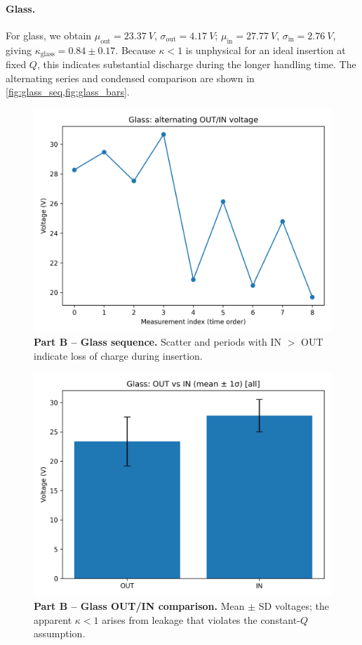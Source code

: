 \documentclass[12pt]{article}
\begin{document}
\paragraph{Glass.}
For glass, we obtain \(\mu_{\text{out}}=\SI{23.37}{V}\), \(\sigma_{\text{out}}=\SI{4.17}{V}\); \(\mu_{\text{in}}=\SI{27.77}{V}\), \(\sigma_{\text{in}}=\SI{2.76}{V}\), giving \(\kappa_{\text{glass}}=0.84\pm0.17\). Because \(\kappa<1\) is unphysical for an ideal insertion at fixed \(Q\), this indicates substantial discharge during the longer handling time. The alternating series and condensed comparison are shown in \cref{fig:glass_seq,fig:glass_bars}.

\begin{figure}[htbp]
\centering
\includegraphics[width=0.70\linewidth]{PartB_glass.png}
\caption{\textbf{Part B -- Glass sequence.} Scatter and periods with IN \(>\) OUT indicate loss of charge during insertion.}
\label{fig:glass_seq}
\end{figure}

\begin{figure}[htbp]
\centering
\includegraphics[width=0.58\linewidth]{PartB_OUTIN_bars_glass_all.png}
\caption{\textbf{Part B -- Glass OUT/IN comparison.} Mean \(\pm\) SD voltages; the apparent \(\kappa<1\) arises from leakage that violates the constant-\(Q\) assumption.}
\label{fig:glass_bars}
\end{figure}
\FloatBarrier
\end{document}
